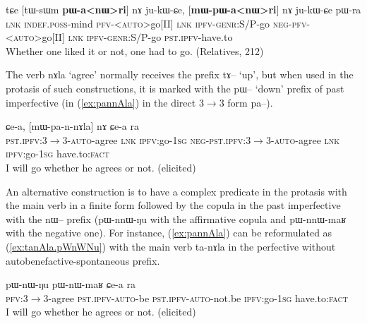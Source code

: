 \documentclass[oldfontcommands,oneside,a4paper,11pt]{article}
\newcommand{\ipa}[1]{{\phon \mbox{#1}}} %
\newcommand{\refb}[1]{(\ref{#1})}
\begin{document}
\begin{exe}
\ex  \label{ex:pannWri}
\gll
\ipa{tɕe}  	[\ipa{tɯ-sɯm}  	\textbf{\ipa{pɯ-a<nɯ>ri}}]  	\ipa{nɤ}  	\ipa{ju-kɯ-ɕe,}  	[\textbf{\ipa{mɯ-pɯ-a<nɯ>ri}}]  	\ipa{nɤ}  	\ipa{ju-kɯ-ɕe}  	\ipa{pɯ-ra}  \\
\textsc{lnk} \textsc{indef.poss}-mind  \textsc{pfv-<auto>}go[II] \textsc{lnk} \textsc{ipfv-genr}:S/P-go \textsc{neg-pfv-<auto>}go[II] \textsc{lnk} \textsc{ipfv-genr}:S/P-go \textsc{pst.ipfv}-have.to \\
\glt Whether one liked it or not, one had to go. (Relatives, 212)
\end{exe}

The verb \ipa{nɤla} `agree' normally receives the prefix \ipa{tɤ}-- `up', but when used in the protasis of such constructions, it is marked with the \ipa{pɯ}-- `down' prefix of past imperfective (in \refb{ex:pannAla} in the direct 3$\rightarrow$3 form \ipa{pa}--).

\begin{exe}
\ex  \label{ex:pannAla}
\gll
[\ipa{pa-n-nɤla}]   	\ipa{nɤ}   	\ipa{ɕe-a,}   	[\ipa{mɯ-pa-n-nɤla}]   	\ipa{nɤ}   	\ipa{ɕe-a}   	\ipa{ra}   \\
 \textsc{pst.ipfv}:3$\rightarrow$3-\textsc{auto}-agree \textsc{lnk} \textsc{ipfv}:go-\textsc{1sg}
  \textsc{neg-pst.ipfv}:3$\rightarrow$3-\textsc{auto}-agree \textsc{lnk} \textsc{ipfv}:go-\textsc{1sg} have.to:\textsc{fact} \\
\glt I will go whether he agrees or not. (elicited)
\end{exe}
 An alternative construction is to have a  complex predicate in the protasis with the main verb in a finite form followed by the copula in the past imperfective with the \ipa{nɯ}-- prefix (\ipa{pɯ-nnɯ-ŋu} with the affirmative copula and \ipa{pɯ-nnɯ-maʁ} with the negative one). For instance, \refb{ex:pannAla} can be reformulated as \refb{ex:tanAla.pWnWNu} with the main verb \ipa{ta-nɤla} in the perfective without autobenefactive-spontaneous prefix.
 
\begin{exe}
\ex  \label{ex:tanAla.pWnWNu}
\gll  \ipa{ta-nɤla}   	\ipa{pɯ-nɯ-ŋu}   	\ipa{pɯ-nɯ-maʁ}   	\ipa{ɕe-a}   	\ipa{ra}   \\
\textsc{pfv}:3$\rightarrow$3-agree \textsc{pst.ipfv-auto}-be \textsc{pst.ipfv-auto}-not.be \textsc{ipfv}:go-\textsc{1sg} have.to:\textsc{fact} \\
\glt I will go whether he agrees or not. (elicited)
\end{exe}
\end{document}

